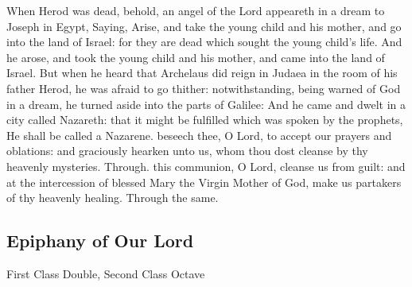  When Herod was dead, behold, an angel of the Lord appeareth in a dream to Joseph in Egypt, Saying, Arise, and take the young child and his mother, and go into the land of Israel: for they are dead which sought the young child's life. And he arose, and took the young child and his mother, and came into the land of Israel. But when he heard that Archelaus did reign in Judaea in the room of his father Herod, he was afraid to go thither: notwithstanding, being warned of God in a dream, he turned aside into the parts of Galilee: And he came and dwelt in a city called Nazareth: that it might be fulfilled which was spoken by the prophets, He shall be called a Nazarene.
\secret
{} beseech thee, O Lord, to accept our prayers and oblations: and graciously hearken unto us, whom thou dost cleanse by thy heavenly mysteries. Through.
\postcommunion
{} this communion, O Lord, cleanse us from guilt: and at the intercession of blessed Mary the Virgin Mother of God, make us partakers of thy heavenly healing. Through the same.


\subsection{Epiphany of Our Lord}\label{EpiphanyMass}
\begin{inhead}
{First Class Double, Second Class Octave}
\end{inhead}


